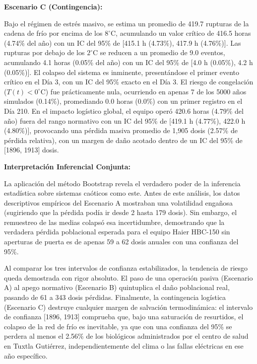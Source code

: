 \documentclass[
  spanish,
  us-letterpaper,
]{scrreprt}
\numberwithin{equation}{section}
\theoremstyle{plain}
\theoremstyle{plain}
\theoremstyle{plain}
\theoremstyle{definition}
\theoremstyle{remark}
\begin{document}
\textbf{Escenario C (Contingencia):}

Bajo el régimen de estrés masivo, se estima un promedio de 419.7
rupturas de la cadena de frío por encima de los \(8^\circ\text{C}\),
acumulando un valor crítico de 416.5 horas (4.74\% del año) con un IC
del 95\% de {[}415.1 h (4.73\%), 417.9 h (4.76\%){]}. Las rupturas por
debajo de los \(2^\circ\text{C}\) se reducen a un promedio de 9.0
eventos, acumulando 4.1 horas (0.05\% del año) con un IC del 95\% de
{[}4.0 h (0.05\%), 4.2 h (0.05\%){]}. El colapso del sistema es
inminente, presentándose el primer evento crítico en el Día 3, con un IC
del 95\% exacto en el Día 3. El riesgo de congelación
(\(T(t)<0^\circ\text{C}\)) fue prácticamente nula, ocurriendo en apenas
7 de los 5000 años simulados (0.14\%), promediando 0.0 horas (0.0\%) con
un primer registro en el Día 210. En el impacto logístico global, el
equipo operó 420.6 horas (4.79\% del año) fuera del rango normativo con
un IC del 95\% de {[}419.1 h (4.77\%), 422.0 h (4.80\%){]}, provocando
una pérdida masiva promedio de 1,905 dosis (2.57\% de pérdida relativa),
con un margen de daño acotado dentro de un IC del 95\% de {[}1896,
1913{]} dosis.

\textbf{Interpretación Inferencial Conjunta:}

La aplicación del método Bootstrap revela el verdadero poder de la
inferencia estadística sobre sistemas caóticos como este. Antes de este
análisis, los datos descriptivos empíricos del Escenario A mostraban una
volatilidad engañosa (sugiriendo que la pérdida podía ir desde 2 hasta
179 dosis). Sin embargo, el remuestreo de las medias colapsó esa
incertidumbre, demostrando que la verdadera pérdida poblacional esperada
para el equipo Haier HBC-150 sin aperturas de puerta es de apenas 59 a
62 dosis anuales con una confianza del 95\%.

Al comparar los tres intervalos de confianza estabilizados, la tendencia
de riesgo queda demostrada con rigor absoluto. El paso de una operación
pasiva (Escenario A) al apego normativo (Escenario B) quintuplica el
daño poblacional real, pasando de 61 a 343 dosis pérdidas. Finalmente,
la contingencia logística (Escenario C) destruye cualquier margen de
salvación termodinámica: el intervalo de confianza {[}1896, 1913{]}
comprueba que, bajo una saturación de resurtidos, el colapso de la red
de frío es inevitable, ya que con una confianza del 95\% se perdera al
menos el 2.56\% de los biológicos administrados por el centro de salud
en Tuxtla Gutiérrez, independientemente del clima o las fallas
eléctricas en ese año específico.
\end{document}
